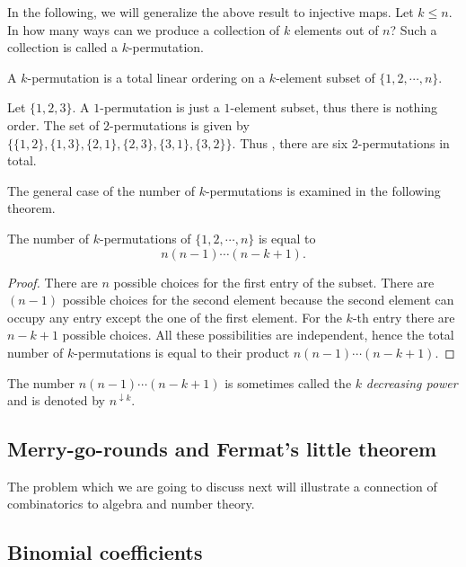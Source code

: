 In the following, we will generalize the above result to injective maps. Let $k \leq n$. In how many ways can we produce a collection 
of $k$ elements out of $n$? Such a collection is called a $k$-permutation.

\begin{defn}[$k$-permutation]
A $k$-permutation is a total linear ordering on a $k$-element subset of $\{1, 2, \cdots, n\}$.
\end{defn}

\begin{exmp}
Let $\{1,2 ,3\}$. A $1$-permutation is just a $1$-element subset, thus there is nothing order. The set of 
$2$-permutations is given by $\{\{1,2\}, \{1,3\}, \{2,1\}, \{2,3\}, \{3,1\}, \{3,2\}\}$.
Thus , there are six $2$-permutations in total.
\end{exmp}

\newpage

The general case of the number of $k$-permutations is examined in the following theorem.

\begin{theorem}
The number of $k$-permutations of $\{1,2, \cdots, n\}$ is equal to $$n(n-1)\cdots (n-k+1).$$
\end{theorem}

\begin{proof}
There are $n$ possible choices for the first entry of the subset. There are $(n-1)$ possible choices for the second element because the second element can occupy any entry except the one of the first element. 
For the $k$-th entry there are $n-k+1$ possible choices. All these possibilities are independent, hence
the total number of $k$-permutations is equal to their product $n(n-1)\cdots (n-k+1)$.
\end{proof}

The number $n(n-1)\cdots (n-k+1)$ is sometimes called the $k$ \textit{decreasing power} and is denoted by $n^{\downarrow k}$.

\subsection{Merry-go-rounds and Fermat's little theorem}

The problem which we are going to discuss next will illustrate a connection of combinatorics to algebra and number theory.

\subsection{Binomial coefficients}

